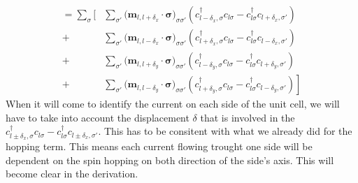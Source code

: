 \documentclass[../main.tex]{subfile}
\begin{document}
\begin{equation}\label{eq:CurrentAltermagCommu}
    \begin{aligned}
        = \sum_{\sigma}\Biggl[&
                \sum_{\sigma'}\bigl(\bm{m}_{l,l+\delta_x}\cdot\bm{\sigma}\bigr)_{\sigma\sigma'}
                \left(c_{l-\delta_x,\sigma}^{\dagger}c_{l\sigma} - c_{l\sigma}^{\dagger}c_{l+\delta_x,\sigma'} \right) \\
                +&\sum_{\sigma'}\bigl(\bm{m}_{l,l-\delta_x}\cdot\bm{\sigma}\bigr)_{\sigma\sigma'}
                \left(c_{l+\delta_x,\sigma}^{\dagger}c_{l\sigma} - c_{l\sigma}^{\dagger}c_{l-\delta_x,\sigma'} \right) \\
                +&\sum_{\sigma'}\bigl(\bm{m}_{l,l+\delta_y}\cdot\bm{\sigma}\bigr)_{\sigma\sigma'}
                \left(c_{l-\delta_y,\sigma}^{\dagger}c_{l\sigma} - c_{l\sigma}^{\dagger}c_{l+\delta_y,\sigma'} \right) \\
                +& \sum_{\sigma'}\bigl(\bm{m}_{l,l-\delta_y}\cdot\bm{\sigma}\bigr)_{\sigma\sigma'}
                \left.\left(c_{l+\delta_y,\sigma}^{\dagger}c_{l\sigma} - c_{l\sigma}^{\dagger}c_{l-\delta_y,\sigma'} \right) \right]
    \end{aligned}
\end{equation} 
When it will come to identify the current on each side of the unit cell, we will have to take into account the displacement $\delta$ that is involved in the 
$c_{l\pm\delta_x,\sigma}^{\dagger}c_{l\sigma} -c_{l\sigma}^{\dagger}c_{l\pm\delta_x,\sigma'}$.
This has to be consitent with what we already did for the hopping term. This means each current flowing trought one side will be dependent on the spin hopping on both direction 
of the side's axis. This will become clear in the derivation.\\
\end{document}
